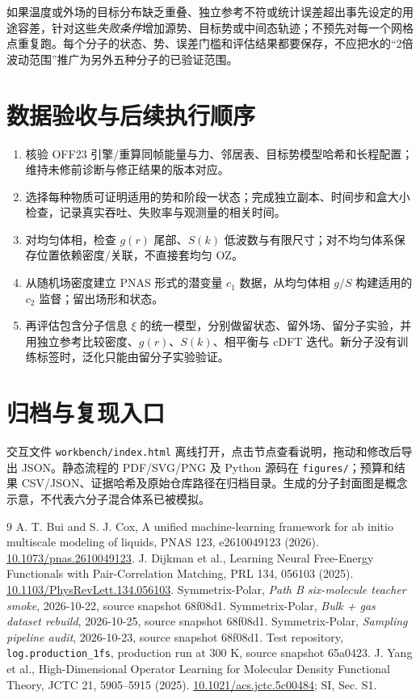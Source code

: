 \documentclass[11pt,a4paper]{article}
\begin{document}
如果温度或外场的目标分布缺乏重叠、独立参考不符或统计误差超出事先设定的用途容差，针对这些\emph{失败条件}增加源势、目标势或中间态轨迹；不预先对每一个网格点重复跑。每个分子的状态、势、误差门槛和评估结果都要保存，不应把水的“2倍波动范围”推广为另外五种分子的已验证范围。

\section{数据验收与后续执行顺序}
\begin{enumerate}
\item 核验 OFF23 引擎/重算同帧能量与力、邻居表、目标势模型哈希和长程配置；维持未修前诊断与修正结果的版本对应。
\item 选择每种物质可证明适用的势和阶段一状态；完成独立副本、时间步和盒大小检查，记录真实吞吐、失败率与观测量的相关时间。
\item 对均匀体相，检查 $g(r)$ 尾部、$S(k)$ 低波数与有限尺寸；对不均匀体系保存位置依赖密度/关联，不直接套均匀 OZ。
\item 从随机场密度建立 PNAS 形式的潜变量 $c_1$ 数据，从均匀体相 $g/S$ 构建适用的 $c_2$ 监督；留出场形和状态。
\item 再评估包含分子信息 $\xi$ 的统一模型，分别做留状态、留外场、留分子实验，并用独立参考比较密度、$g(r)$、$S(k)$、相平衡与 cDFT 迭代。新分子没有训练标签时，泛化只能由留分子实验验证。
\end{enumerate}

\section{归档与复现入口}
交互文件 \texttt{workbench/index.html} 离线打开，点击节点查看说明，拖动和修改后导出 JSON。静态流程的 PDF/SVG/PNG 及 Python 源码在 \texttt{figures/}；预算和结果 CSV/JSON、证据哈希及原始仓库路径在归档目录。生成的分子封面图是概念示意，不代表六分子混合体系已被模拟。

\begin{thebibliography}{9}
 A. T. Bui and S. J. Cox, A unified machine-learning framework for ab initio multiscale modeling of liquids, PNAS 123, e2610049123 (2026). \href{https://doi.org/10.1073/pnas.2610049123}{10.1073/pnas.2610049123}.
 J. Dijkman et al., Learning Neural Free-Energy Functionals with Pair-Correlation Matching, PRL 134, 056103 (2025). \href{https://doi.org/10.1103/PhysRevLett.134.056103}{10.1103/PhysRevLett.134.056103}.
 Symmetrix-Polar, \textit{Path B six-molecule teacher smoke}, 2026-10-22, source snapshot 68f08d1.
 Symmetrix-Polar, \textit{Bulk + gas dataset rebuild}, 2026-10-25, source snapshot 68f08d1.
 Symmetrix-Polar, \textit{Sampling pipeline audit}, 2026-10-23, source snapshot 68f08d1.
 Test repository, \texttt{log.production\_1fs}, production run at 300 K, source snapshot 65a0423.
 J. Yang et al., High-Dimensional Operator Learning for Molecular Density Functional Theory, JCTC 21, 5905--5915 (2025). \href{https://doi.org/10.1021/acs.jctc.5c00484}{10.1021/acs.jctc.5c00484}; SI, Sec. S1.
\end{thebibliography}
\end{document}
